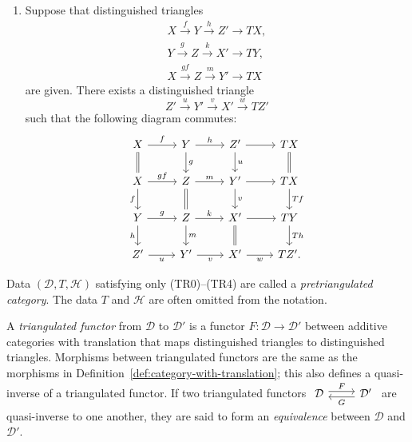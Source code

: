 \begin{definition}
\begin{enumerate}[(TR1)]
		$\gamma:Z\to Z'$ as indicated by the dashed arrow such that the whole
		diagram containing $\alpha$, $\beta$, $\gamma$, and $T\alpha$
		commutes. Thus one obtains a morphism of triangles.
		\item Suppose that distinguished triangles
		\begin{gather*}
			X\xrightarrow{f}Y\xrightarrow{h}Z'\to TX,\\
			Y\xrightarrow{g}Z\xrightarrow{k}X'\to TY,\\
			X\xrightarrow{gf}Z\xrightarrow{m}Y'\to TX
		\end{gather*}
		are given. There exists a distinguished triangle
		\[ Z'\xrightarrow{u}Y'\xrightarrow{v}X'\xrightarrow{w}TZ' \]
		such that the following diagram commutes:
		\[\begin{tikzcd}
			X \arrow[r,"f"] \arrow[equal,d] &
			Y \arrow[r,"h"] \arrow[d,"g"] &
			Z' \arrow[r] \arrow[d,"u"] & TX \arrow[equal,d] \\
			X \arrow[r,"gf"] \arrow[d,"f"'] &
			Z \arrow[r,"m"] \arrow[equal,d] &
			Y' \arrow[r] \arrow[d,"v"] & TX \arrow[d,"Tf"] \\
			Y \arrow[r,"g"] \arrow[d,"h"'] &
			Z \arrow[r,"k"] \arrow[d,"m"] &
			X' \arrow[r] \arrow[equal,d] & TY \arrow[d,"Th"] \\
			Z' \arrow[r,"u"'] & Y' \arrow[r,"v"'] &
			X' \arrow[r,"w"'] & TZ'.
		\end{tikzcd}\]
	\end{enumerate}

	Data $(\mathcal{D},T,\mathcal{H})$ satisfying only (TR0)--(TR4) are
	called a \emph{pretriangulated category}. The data $T$ and $\mathcal{H}$
	are often omitted from the notation.

	A \emph{triangulated functor} from $\mathcal{D}$ to $\mathcal{D}'$ is a
	functor $F:\mathcal{D}\to\mathcal{D}'$ between additive categories with
	translation that maps distinguished triangles to distinguished triangles.
	Morphisms between triangulated functors are the same as the morphisms in
	Definition~\ref{def:category-with-translation}; this also defines a
	quasi-inverse of a triangulated functor. If two triangulated functors
	$\begin{tikzcd}
		\mathcal{D} \arrow[shift left,r,"F"] &
		\mathcal{D}' \arrow[shift left,l,"G"]
	\end{tikzcd}$
	are quasi-inverse to one another, they are said to form an
	\emph{equivalence} between $\mathcal{D}$ and $\mathcal{D}'$.
\end{definition}

